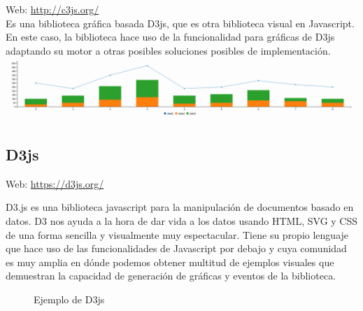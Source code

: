 Web: \url{http://c3js.org/}\\

Es una biblioteca gráfica basada D3js, que es otra biblioteca visual en Javascript. En este caso, la biblioteca hace uso de la funcionalidad para gráficas de D3js adaptando su motor a otras posibles soluciones posibles de implementación.\\

\includegraphics[scale=0.25]{diagramas/c3js-chart.png}

\subsection{D3js}

Web: \url{https://d3js.org/}

D3.js es una biblioteca javascript para la manipulación de documentos basado en datos. D3 nos ayuda a la hora de dar vida a los datos usando HTML, SVG y CSS de una forma sencilla y visualmente muy espectacular. Tiene su propio lenguaje que hace uso de las funcionalidades de Javascript por debajo y cuya comunidad es muy amplia en dónde podemos obtener multitud de ejemplos visuales que demuestran la capacidad de generación de gráficas y eventos de la biblioteca.\\

\begin{figure}[H]
  \caption{Ejemplo de D3js}
\end{figure}



